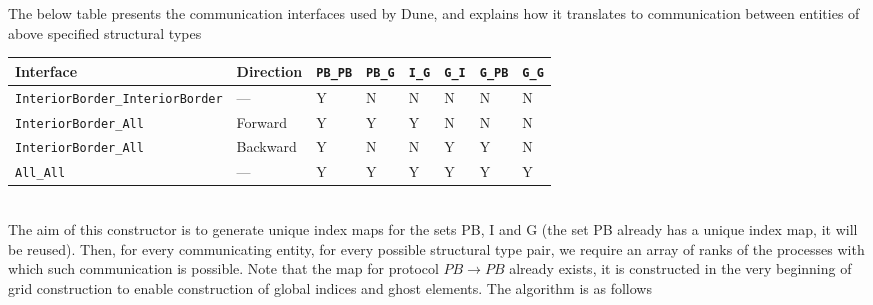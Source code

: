 \noindent
The below table presents the communication interfaces used by Dune, and explains how it translates to communication between entities of above specified structural types \\

\noindent
\begin{tabular}{ | l | l | l | l | l | l | l | l | }
  \hline
  Interface & Direction &
      \lstinline|PB_PB| &
      \lstinline|PB_G| &
      \lstinline|I_G| &
      \lstinline|G_I| &
      \lstinline|G_PB| &
      \lstinline|G_G| \\ \hline
  \lstinline|InteriorBorder_InteriorBorder| & ---      & Y & N & N & N & N & N \\ \hline
  \lstinline|InteriorBorder_All|            & Forward  & Y & Y & Y & N & N & N \\ \hline
  \lstinline|InteriorBorder_All|            & Backward & Y & N & N & Y & Y & N \\ \hline
  \lstinline|All_All|                       & ---      & Y & Y & Y & Y & Y & Y \\ \hline
\end{tabular} \\

\noindent
The aim of this constructor is to generate unique index maps for the sets PB, I and G (the set PB already has a unique index map, it will be reused). Then, for every communicating entity, for every possible structural type pair, we require an array of ranks of the processes with which such communication is possible. Note that the map for protocol $PB\rightarrow PB$ already exists, it is constructed in the very beginning of grid construction to enable construction of global indices and ghost elements. The algorithm is as follows

